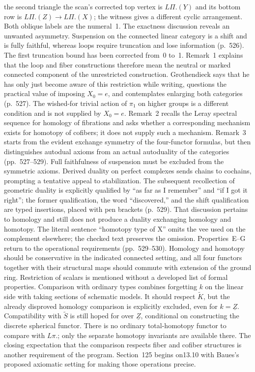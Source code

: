 \documentclass[10pt,oneside]{book}
\begin{document}
the second triangle the scan's corrected top vertex is $L\Pi.(Y)$ and its bottom row is $L\Pi.(Z)\to L\Pi.(X)$; the witness gives a different cyclic arrangement. Both oblique labels are the numeral~1. The exactness discussion reveals an unwanted asymmetry. Suspension on the connected linear category is a shift and is fully faithful, whereas loops require truncation and lose information (p.~526). The first truncation bound has been corrected from~0 to~1. Remark~1 explains that the loop and fiber constructions therefore mean the neutral or marked connected component of the unrestricted construction. Grothendieck says that he has only just become aware of this restriction while writing, questions the practical value of imposing $X_0=e$, and contemplates enlarging both categories (p.~527). The wished-for trivial action of $\pi_1$ on higher groups is a different condition and is not supplied by $X_0=e$. Remark~2 recalls the Leray spectral sequence for homology of fibrations and asks whether a corresponding mechanism exists for homotopy of cofibers; it does not supply such a mechanism. Remark~3 starts from the evident exchange symmetry of the four-functor formulas, but then distinguishes autodual axioms from an actual autoduality of the categories (pp.~527--529). Full faithfulness of suspension must be excluded from the symmetric axioms. Derived duality on perfect complexes sends chains to cochains, prompting a tentative appeal to stabilization. The subsequent recollection of geometric duality is explicitly qualified by ``as far as I remember'' and ``if I got it right''; the former qualification, the word ``discovered,'' and the shift qualification are typed insertions, placed with pen brackets (p.~529). That discussion pertains to homology and still does not produce a duality exchanging homology and homotopy. The literal sentence ``homotopy type of X'' omits the vee used on the complement elsewhere; the checked text preserves the omission. Properties~E--G return to the operational requirements (pp.~529--530). Homology and homotopy should be conservative in the indicated connected setting, and all four functors together with their structural maps should commute with extension of the ground ring. Restriction of scalars is mentioned without a developed list of formal properties. Comparison with ordinary types combines forgetting $k$ on the linear side with taking sections of schematic models. It should respect $\widetilde K$, but the already disproved homology comparison is explicitly excluded, even for $k=\underline Z$. Compatibility with $\widetilde S$ is still hoped for over $\underline Z$, conditional on constructing the discrete spherical functor. There is no ordinary total-homotopy functor to compare with $L\pi.$; only the separate homotopy invariants are available there. The closing expectation that the comparison respects fiber and cofiber structures is another requirement of the program. Section~125 begins on13.10 with Baues's proposed axiomatic setting for making those operations precise.
\end{document}
